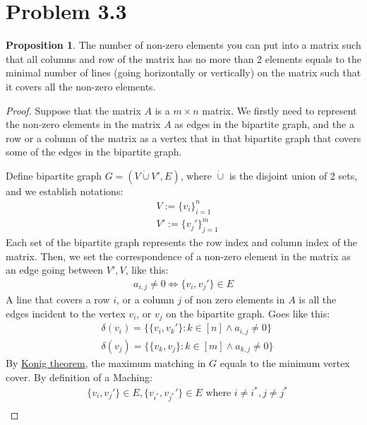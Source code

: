 \documentclass[]{article}
\theoremstyle{definition}
\newtheorem{prop}{Proposition}[section]  %
\begin{document}
\section{Problem 3.3}
    \begin{prop}
        The number of non-zero elements you can put into a matrix such that all columns and row of the matrix has no more than 2 elements equals to the minimal number of lines (going horizontally or vertically) on the matrix such that it covers all the non-zero elements. 
    \end{prop}
    \begin{proof}
        Suppose that the matrix $A$ is a $m\times n$ matrix. We firstly need to represent the non-zero elements in the matrix $A$ as edges in the bipartite graph, and the a row or a column of the matrix as a vertex that in that bipartite graph that covers some of the edges in the bipartite graph. 
        \par
        Define bipartite graph $G = (V \dot{\cup}V', E)$, where $\dot{\cup}$ is the disjoint union of 2 sets, and we establish notations: 
        \begin{align}
            & V := \{v_i\}_{i = 1}^{n}
            \\
            & V' := \{v_j'\}_{j = 1}^{m}
        \end{align}
        Each set of the bipartite graph represents the row index and column index of the matrix. Then, we set the correspondence of a non-zero element in the matrix as an edge going between $V', V$, like this: 
        \begin{align}
            a_{i, j} \neq 0 \iff \{v_i, v_j'\} \in E
        \end{align}
        A line that covers a row $i$, or a column $j$ of non zero elements in $A$ is all the edges incident to the vertex $v_i$, or $v_j$ on the bipartite graph. Goes like this: 
        \begin{align}
            & \delta(v_i) = \{\{v_i, v_k'\}: k\in [n] \wedge a_{i, j} \neq 0\}
            \\
            & \delta(v_j) = \{\{v_k, v_j\}: k \in [m] \wedge a_{k, j} \neq 0\}
        \end{align}
        By \hyperref[theorem:konig]{Konig theorem}, the maximum matching in $G$ equals to the minimum vertex cover. By definition of a Maching: 
        \begin{align}
            &\{v_{i}, v_{j}'\} \in E, \{v_{i^*}, v_{j^*}'\} \in E \text{ where } i\neq i^{*}, j \neq j^{*} 
            \\

\end{align}
\end{proof}
\end{document}
